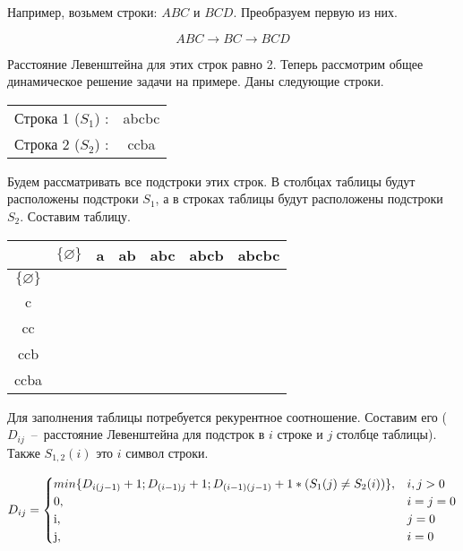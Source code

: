 \documentclass[a4paper,12pt] {report} 			%
\begin{document}
Например, возьмем строки: $ABC$ и $BCD$. Преобразуем первую из них.

$$ABC \rightarrow BC \rightarrow BCD$$

Расстояние Левенштейна для этих строк равно 2. Теперь рассмотрим 
общее динамическое решение задачи на примере. Даны следующие строки.

\begin{center}
	\begin{tabular}{ c c }
		Строка 1 ($S_{1}$) : & abcbc \\
		Строка 2 ($S_{2}$) : & ccba \\
	\end{tabular}
\end{center}

Будем рассматривать все подстроки этих строк. В столбцах таблицы будут расположены 
подстроки $S_{1}$, а в строках таблицы будут расположены подстроки $S_{2}$. Составим таблицу.

\begin{center}
	\begin{tabular}{ | c | c c c c c c | }
		\hline
		& $\{ \varnothing \}$ & a & ab & abc & abcb & abcbc \\
		\hline
		$\{ \varnothing \}$ & & & & & & \\
		c & & & & & & \\
		cc & & & & & & \\
		ccb & & & & & & \\
		ccba & & & & & & \\
		\hline
	\end{tabular}
\end{center}

Для заполнения таблицы потребуется рекурентное соотношение. Составим его 
($D_{ij}$~--~расстояние Левенштейна для подстрок в $i$ строке и $j$ столбце таблицы). 
Также $S_{1,2}(i)$ это $i$ символ строки.

\begin{center}
	\begin{equation*}
	D_{ij} =
		\begin{cases}
			min \{ D_{i(j - 1)} + 1; D_{(i - 1)j} + 1; D_{(i - 1)(j -1)} + 1*(S_{1}(j) \neq S_{2}(i)) \}, & \text{$i,j > 0$} \\
			0, & \text{$i = j = 0$} \\
			$i$, & \text{$j = 0$} \\
			$j$, & \text{$i = 0$} \\
		\end{cases}
	\end{equation*}
\end{center}
\end{document}
